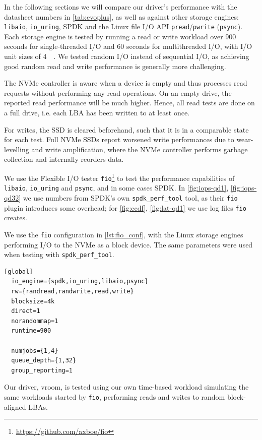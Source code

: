 In the following sections we will compare our driver's performance with the datasheet numbers in \autoref{tab:evoplus}, as well as against other storage engines: \texttt{libaio}, \texttt{io\_uring}, SPDK and the Linux file I/O API \texttt{pread}/\texttt{pwrite} (\texttt{psync}). Each storage engine is tested by running a read or write workload over 900 seconds for single-threaded I/O and 60 seconds for multithreaded I/O, with I/O unit sizes of \qty{4}{\kibi\byte}. We tested random I/O instead of sequential I/O, as achieving good random read and write performance is generally more challenging.

The NVMe controller is aware when a device is empty and thus processes read requests without performing any read operations. On an empty drive, the reported read performance will be much higher. Hence, all read tests are done on a full drive, i.e. each LBA has been written to at least once.

For writes, the SSD is cleared beforehand, such that it is in a comparable state for each test. Full NVMe SSDs report worsened write performances due to wear-levelling and write amplification, where the NVMe controller performs garbage collection and internally reorders data.


We use the Flexible I/O tester \texttt{fio}\footnote{\url{https://github.com/axboe/fio}} to test the performance capabilities of \texttt{libaio}, \texttt{io\_uring} and \texttt{psync}, and in some cases SPDK. In \autoref{fig:iops-qd1}, \autoref{fig:iops-qd32} we use numbers from SPDK's own \texttt{spdk\_perf\_tool} tool, as their \texttt{fio} plugin introduces some overhead; for \autoref{fig:ccdf}, \autoref{fig:lat-qd1} we use log files \texttt{fio} creates.

We use the \texttt{fio} configuration in \autoref{lst:fio_conf}, with the Linux storage engines performing I/O to the NVMe as a block device. The same parameters were used when testing with \texttt{spdk\_perf\_tool}.

\begin{lstlisting}[float, label=lst:fio_conf, caption=\texttt{fio} configuration]
  [global]
  io_engine={spdk,io_uring,libaio,psync}
  rw={randread,randwrite,read,write}
  blocksize=4k
  direct=1
  norandommap=1
  runtime=900

  numjobs={1,4}
  queue_depth={1,32}
  group_reporting=1
\end{lstlisting}

Our driver, vroom, is tested using our own time-based workload simulating the same workloads started by \texttt{fio}, performing reads and writes to random block-aligned LBAs.

